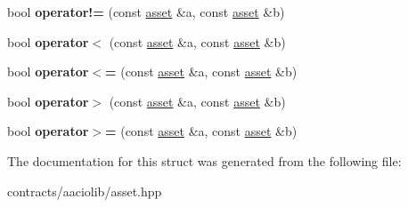 \begin{DoxyCompactItemize}
\item 
\mbox{\label{structaacio_1_1asset_adb0577649f2f48023169390b0b78e234}} 
bool {\bfseries operator!=} (const \mbox{\hyperlink{structaacio_1_1asset}{asset}} \&a, const \mbox{\hyperlink{structaacio_1_1asset}{asset}} \&b)
\item 
\mbox{\label{structaacio_1_1asset_a4c5d8977b23e534426a070f568524d02}} 
bool {\bfseries operator$<$} (const \mbox{\hyperlink{structaacio_1_1asset}{asset}} \&a, const \mbox{\hyperlink{structaacio_1_1asset}{asset}} \&b)
\item 
\mbox{\label{structaacio_1_1asset_a9d586e9b54232432779a91e2d6d8b78e}} 
bool {\bfseries operator$<$=} (const \mbox{\hyperlink{structaacio_1_1asset}{asset}} \&a, const \mbox{\hyperlink{structaacio_1_1asset}{asset}} \&b)
\item 
\mbox{\label{structaacio_1_1asset_a88d1352c1cf2b7377292377449a4ced8}} 
bool {\bfseries operator$>$} (const \mbox{\hyperlink{structaacio_1_1asset}{asset}} \&a, const \mbox{\hyperlink{structaacio_1_1asset}{asset}} \&b)
\item 
\mbox{\label{structaacio_1_1asset_aa5ae6feb2c7097211820fc31cf24b5f5}} 
bool {\bfseries operator$>$=} (const \mbox{\hyperlink{structaacio_1_1asset}{asset}} \&a, const \mbox{\hyperlink{structaacio_1_1asset}{asset}} \&b)
\end{DoxyCompactItemize}


The documentation for this struct was generated from the following file\+:\begin{DoxyCompactItemize}
\item 
contracts/aaciolib/asset.\+hpp\end{DoxyCompactItemize}
